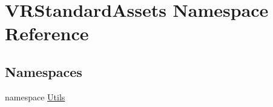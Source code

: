 \hypertarget{namespace_v_r_standard_assets}{}\section{V\+R\+Standard\+Assets Namespace Reference}
\label{namespace_v_r_standard_assets}
\subsection*{Namespaces}
\begin{DoxyCompactItemize}
\item 
namespace \mbox{\hyperlink{namespace_v_r_standard_assets_1_1_utils}{Utils}}
\end{DoxyCompactItemize}
